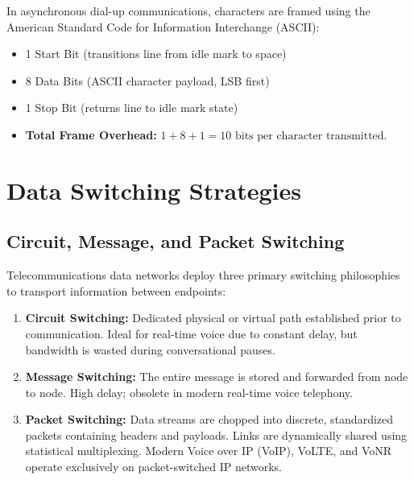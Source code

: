\documentclass[12pt,a4paper]{report}
\begin{document}
In asynchronous dial-up communications, characters are framed using the American Standard Code for Information Interchange (ASCII):
\begin{itemize}
    \item 1 Start Bit (transitions line from idle mark to space)
    \item 8 Data Bits (ASCII character payload, LSB first)
    \item 1 Stop Bit (returns line to idle mark state)
    \item \textbf{Total Frame Overhead:} $1 + 8 + 1 = 10\text{ bits per character transmitted}$.
\end{itemize}

\chapter{Data Switching Strategies}

\section{Circuit, Message, and Packet Switching}
Telecommunications data networks deploy three primary switching philosophies to transport information between endpoints:
\begin{enumerate}
    \item \textbf{Circuit Switching:} Dedicated physical or virtual path established prior to communication. Ideal for real-time voice due to constant delay, but bandwidth is wasted during conversational pauses.
    \item \textbf{Message Switching:} The entire message is stored and forwarded from node to node. High delay; obsolete in modern real-time voice telephony.
    \item \textbf{Packet Switching:} Data streams are chopped into discrete, standardized packets containing headers and payloads. Links are dynamically shared using statistical multiplexing. Modern Voice over IP (VoIP), VoLTE, and VoNR operate exclusively on packet-switched IP networks.
\end{enumerate}
\end{document}
